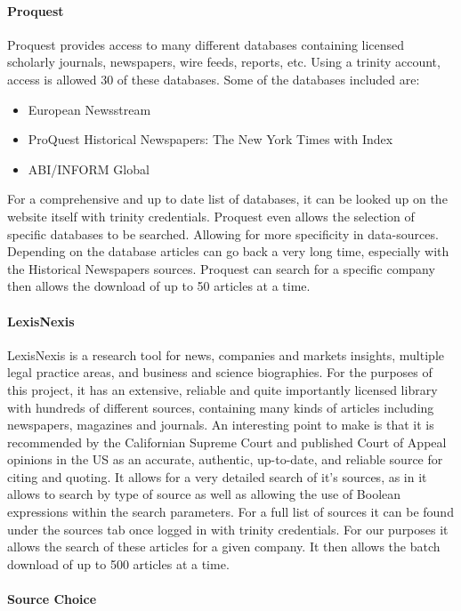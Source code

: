 \paragraph{Proquest}

Proquest provides access to many different databases containing licensed scholarly journals, newspapers, wire feeds, reports, etc. Using a trinity account, access is allowed 30 of these databases. Some of the databases included are:
\begin{itemize}
    \item European Newsstream
    \item ProQuest Historical Newspapers: The New York Times with Index
    \item ABI/INFORM Global‎
\end{itemize}
For a comprehensive and up to date list of databases, it can be looked up on the website itself with trinity credentials. Proquest even allows the selection of specific databases to be searched. Allowing for more specificity in data-sources. Depending on the database articles can go back a very long time, especially with the Historical Newspapers sources. Proquest can search for a specific company then allows the download of up to 50 articles at a time.

\paragraph{LexisNexis}

LexisNexis is a research tool for news, companies and markets insights, multiple legal practice areas, and business and science biographies. For the purposes of this project, it has an extensive, reliable and quite importantly licensed library with hundreds of different sources, containing many kinds of articles including newspapers, magazines and journals. An interesting point to make is that it is recommended by the Californian Supreme Court and published Court of Appeal opinions in the US as an accurate, authentic, up-to-date, and reliable source for citing and quoting. It allows for a very detailed search of it's sources, as in it allows to search by type of source as well as allowing the use of Boolean expressions within the search parameters. For a full list of sources it can be found under the sources tab once logged in with trinity credentials. For our purposes it allows the search of these articles for a given company. It then allows the batch download of up to 500 articles at a time.

\paragraph{Source Choice}

